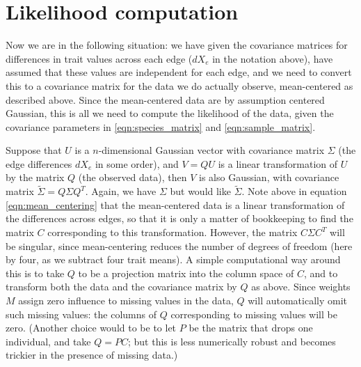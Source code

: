 \documentclass{article}
\begin{document}
\section{Likelihood computation}

Now we are in the following situation:
we have given the covariance matrices for differences in trait values across each edge ($dX_e$ in the notation above),
have assumed that these values are independent for each edge,
and we need to convert this to a covariance matrix for the data we do actually observe,
mean-centered as described above.
Since the mean-centered data are by assumption centered Gaussian, 
this is all we need to compute the likelihood of the data, given the covariance parameters in \eqref{eqn:species_matrix} and \eqref{eqn:sample_matrix}.

Suppose that $U$ is a $n$-dimensional Gaussian vector with covariance matrix $\Sigma$ (the edge differences $dX_e$ in some order),
and $V = Q U$ is a linear transformation of $U$ by the matrix $Q$ (the observed data),
then $V$ is also Gaussian, with covariance matrix $\widetilde \Sigma = Q \Sigma Q^T$.
Again, we have $\Sigma$ but would like $\widetilde \Sigma$.
Note above in equation \eqref{eqn:mean_centering} that the mean-centered data is a linear transformation of the differences across edges,
so that it is only a matter of bookkeeping to find the matrix $C$ corresponding to this transformation.
However, the matrix $C \Sigma C^T$ will be singular, since mean-centering reduces the number of degrees of freedom (here by four, as we subtract four trait means).
A simple computational way around this is to take $Q$ to be a projection matrix into the column space of $C$,
and to transform both the data and the covariance matrix by $Q$ as above.
Since weights $M$ assign zero influence to missing values in the data,
$Q$ will automatically omit such missing values: the columns of $Q$ corresponding to missing values will be zero.
(Another choice would to be to let $P$ be the matrix that drops one individual, and take $Q = PC$; 
but this is less numerically robust
and becomes trickier in the presence of missing data.)
\end{document}
